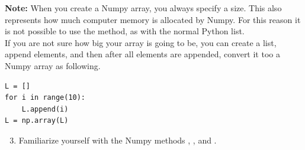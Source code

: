 \documentclass{article}
\begin{document}
{\bf Note:}
When you create a Numpy array, you always specify a size.
This also represents how much computer memory is allocated by Numpy.
For this reason it is not possible to use the  method, as with
the normal Python list.\\

If you are not sure how big your array is going to be, you can create a list, append elements,
and then after all elements are appended, convert it too a Numpy array as following.

\begin{lstlisting}
L = []
for i in range(10):
    L.append(i)
L = np.array(L)
\end{lstlisting}

\begin{enumerate}
    \setcounter{enumi}{2}
    \item Familiarize yourself with the Numpy methods , ,  and .
\end{enumerate}


%
%
%
%
%
%
%
%
%
%
%
%
%
%
%
\end{document}
